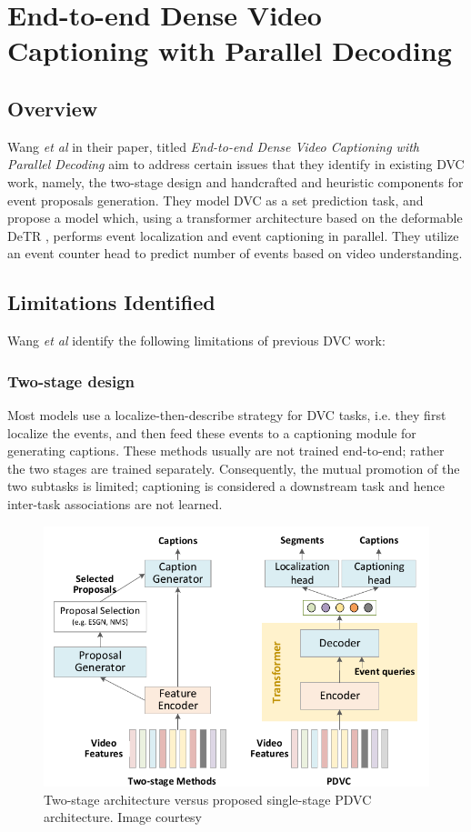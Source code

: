 \section{End-to-end Dense Video Captioning with Parallel Decoding}

\subsection{Overview}
\par Wang \textit{et al} in their paper, titled \textit{End-to-end Dense Video Captioning with Parallel Decoding} \cite{wang2021endtoend} aim to address certain issues that they identify in existing DVC work, namely, the two-stage design and handcrafted and heuristic components for event proposals generation. They model DVC as a set prediction task, and propose a model which, using a transformer architecture based on the deformable DeTR \cite{}, performs event localization and event captioning in parallel. They utilize an event counter head to predict number of events based on video understanding.

\subsection{Limitations Identified}
\par Wang \textit{et al} identify the following limitations of previous DVC work:
\subsubsection{Two-stage design} Most models use a localize-then-describe strategy for DVC tasks, i.e. they first localize the events, and then feed these events to a captioning module for generating captions. These methods usually are not trained end-to-end; rather the two stages are trained separately. Consequently, the mutual promotion of the two subtasks is limited; captioning is considered a downstream task and hence inter-task associations are not learned.

\begin{figure}[h]
\centering
\includegraphics[width=0.5\linewidth]{assets/img/pdvc/single-stage.png}
\caption{Two-stage architecture versus proposed single-stage PDVC architecture. Image courtesy \cite{wang2021endtoend}}
\end{figure}

